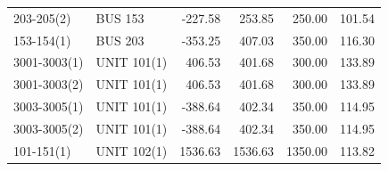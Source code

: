 \documentclass[10pt]{report}
\begin{document}
\begin{table}[H]
{\begin{tabular}{llrrrr}
203-205(2) & BUS 153 & -227.58 & 253.85 & 250.00 & 101.54 \\
153-154(1) & BUS 203 & -353.25 & 407.03 & 350.00 & 116.30 \\
3001-3003(1) & UNIT 101(1) & 406.53 & 401.68 & 300.00 & 133.89 \\
3001-3003(2) & UNIT 101(1) & 406.53 & 401.68 & 300.00 & 133.89 \\
3003-3005(1) & UNIT 101(1) & -388.64 & 402.34 & 350.00 & 114.95 \\
3003-3005(2) & UNIT 101(1) & -388.64 & 402.34 & 350.00 & 114.95 \\
101-151(1) & UNIT 102(1) & 1536.63 & 1536.63 & 1350.00 & 113.82 \\
\bottomrule
\end{tabular}}
\end{table}
\end{document}
